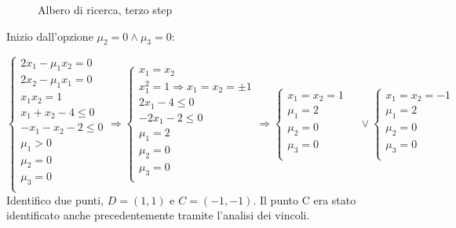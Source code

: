 \documentclass[\main/main.tex]{subfiles}
\begin{document}
\begin{figure}
  \caption{Albero di ricerca, terzo step}
\end{figure}

Inizio dall'opzione $\mu_2=0 \land \mu_3=0$:

\[
  \begin{cases}
    2x_1-\mu_1x_2 = 0     \\
    2x_2-\mu_1x_1 = 0     \\
    x_1x_2 = 1            \\
    x_1 + x_2 -4 \leq 0   \\
    -x_1 - x_2 - 2 \leq 0 \\
    \mu_1 > 0             \\
    \mu_2 = 0             \\
    \mu_3 = 0             \\
  \end{cases}
  \Rightarrow
  \begin{cases}
    x_1 = x_2                               \\
    x^2_1 = 1 \Rightarrow x_1 = x_2 = \pm 1 \\
    2x_1 -4 \leq 0                          \\
    -2x_1 - 2 \leq 0                        \\
    \mu_1 = 2                               \\
    \mu_2 = 0                               \\
    \mu_3 = 0                               \\
  \end{cases}
  \Rightarrow
  \begin{cases}
    x_1 = x_2 = 1 \\
    \mu_1 = 2     \\
    \mu_2 = 0     \\
    \mu_3 = 0     \\
  \end{cases}
  \quad \lor
  \begin{cases}
    x_1 = x_2 = -1 \\
    \mu_1 = 2      \\
    \mu_2 = 0      \\
    \mu_3 = 0      \\
  \end{cases}
\]
Identifico due punti, $D =(1,1)$ e $C = (-1,-1)$. Il punto C era stato identificato anche precedentemente tramite l'analisi dei vincoli.
\end{document}
